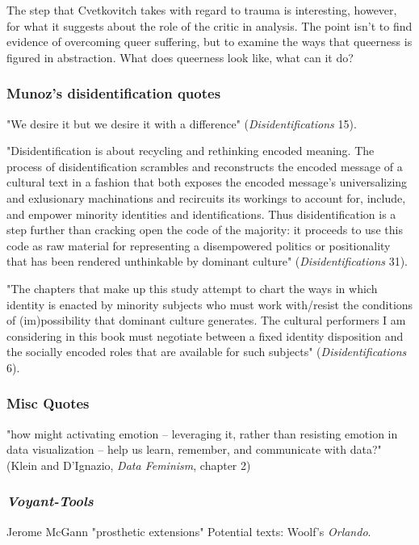 \documentclass[11pt]{article}
\begin{document}
The step that Cvetkovitch takes with regard to trauma is interesting,
however, for what it suggests about the role of the critic in
analysis. The point isn't to find evidence of overcoming queer
suffering, but to examine the ways that queerness is figured in
abstraction. What does queerness look like, what can it do? 

\subsubsection{Munoz's disidentification quotes}
\label{sec:orgf6295f1}

"We desire it but we desire it with a difference"
(\emph{Disidentifications} 15).

"Disidentification is about recycling and rethinking encoded
meaning. The process of disidentification scrambles and reconstructs
the encoded message of a cultural text in a fashion that both exposes
the encoded message's universalizing and exlusionary machinations and
recircuits its workings to account for, include, and empower minority
identities and identifications. Thus disidentification is a step
further than cracking open the code of the majority: it proceeds to
use this code as raw material for representing a disempowered politics
or positionality that has been rendered unthinkable by dominant
culture" (\emph{Disidentifications} 31).

"The chapters that make up this study attempt to chart the ways
in which identity is enacted by minority subjects who must work
with/resist the conditions of (im)possibility that dominant culture
generates. The cultural performers I am considering in this book must
negotiate between a fixed identity disposition and the socially
encoded roles that are available for such subjects"
(\emph{Disidentifications} 6). 

\subsubsection{Misc Quotes}
\label{sec:orga1b6db9}
"how might activating emotion – leveraging it, rather than resisting
emotion in data visualization – help us learn, remember, and
communicate with data?" (Klein and D'Ignazio, \emph{Data Feminism},
chapter 2)

\subsubsection{\emph{Voyant-Tools}}
\label{sec:org2d2bf90}
Jerome McGann "prosthetic extensions"
Potential texts: Woolf's \emph{Orlando}. 
\end{document}
